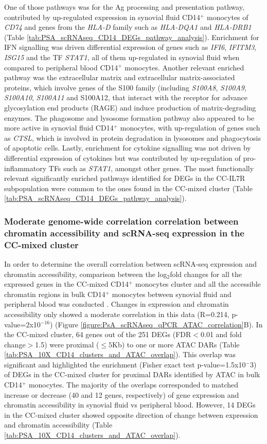 One of those pathways was for the Ag processing and presentation pathway, contributed by up-regulated expression in synovial fluid CD14$^+$ monocytes of \textit{CD74} and genes from the \textit{HLA-D} family such as \textit{HLA-DQA1} and \textit{HLA-DRB1} (Table \ref{tab:PSA_scRNAseq_CD14_DEGs_pathway_analysis}). Enrichment for IFN signalling was driven differential expression of genes such as \textit{IFI6}, \textit{IFITM3}, \textit{ISG15} and the TF \textit{STAT1}, all of them up-regulated in synovial fluid when compared to peripheral blood CD14$^+$ monocytes. Another relevant enriched pathway was the extracellular matrix and extracellular matrix-associated proteins, which involve genes of the S100 family (including \textit{S100A8}, \textit{S100A9}, \textit{S100A10}, \textit{S100A11} and S100A12, that interact with the receptor for advance glycosylation end products (RAGE) and induce production of matrix-degrading enzymes. The phagosome and lysosome formation pathway also appeared to be more active in synovial fluid CD14$^+$ monocytes, with up-regulation of genes such as \textit{CTSL}, which is involved in protein degradation in lysosomes and phagocytosis of apoptotic cells. Lastly, enrichment for cytokine signalling was not driven by differential expression of cytokines but was contributed by up-regulation of pro-inflammatory TFs such as \textit{STAT1}, amongst other genes. The most functionally relevant significantly enriched pathways identified for DEGs in the CC-IL7R subpopulation were common to the ones found in the CC-mixed cluster (Table \ref{tab:PSA_scRNAseq_CD14_DEGs_pathway_analysis}).



\subsubsection{Moderate genome-wide correlation correlation between chromatin accessibility and scRNA-seq expression in the CC-mixed cluster}
In order to determine the overall correlation between scRNA-seq expression and chromatin accessibility, comparison between the log$_2$fold changes for all the expressed genes in the CC-mixed CD14$^+$ monocytes cluster and all the accessible chromatin regions in bulk CD14$^+$ monocytes between synovial fluid and peripheral blood was conducted . Changes in expression and chromatin accessibility only showed a moderate correlation in this data (R=0.214, p-value=2x10$^{-16}$) (Figure \ref{figure:PsA_scRNAseq_qPCR_ATAC_correlation}B). In the CC-mixed cluster, 64 genes out of the 251 DEGs (FDR$<$0.01 and fold change$>$1.5) were proximal ($\leq5$Kb) to one or more ATAC DARs (Table \ref{tab:PSA_10X_CD14_clusters_and_ATAC_overlap}). This overlap was significant and highlighted the enrichment (Fisher exact test p-value=1.5x10$^-3$) of DEGs in the CC-mixed cluster for proximal DARs identified by ATAC in bulk CD14$^+$ monocytes. The majority of the overlaps corresponded to matched increase or decrease (40 and 12 genes, respectively) of gene expression and chromatin accessibility in synovial fluid vs peripheral blood. However, 14 DEGs in the CC-mixed cluster showed opposite direction of change between expression and chromatin accessibility (Table \ref{tab:PSA_10X_CD14_clusters_and_ATAC_overlap}). 


